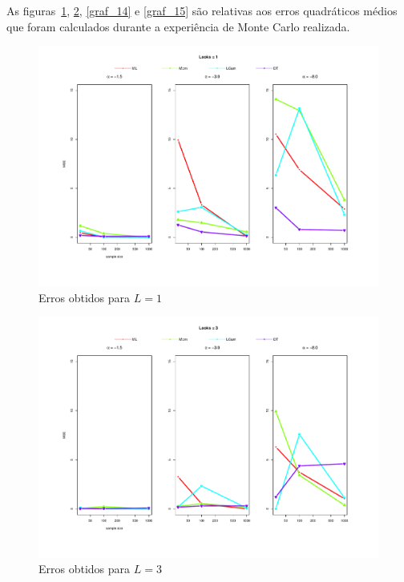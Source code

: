 As figuras~\ref{graf_12}, \ref{graf_13}, \ref{graf_14} e \ref{graf_15} são relativas aos erros quadráticos médios que foram calculados durante a experiência de Monte Carlo realizada. 
\begin{figure}[H]
     \centering
     \includegraphics[scale=0.5]{plots/mse_L=1.pdf}
     \caption{Erros obtidos para $L=1$}
     \label{graf_12}
\end{figure}
\begin{figure}[H]
     \centering
     \includegraphics[scale=0.5]{plots/mse_L=3.pdf}
     \caption{Erros obtidos para $L=3$}
     \label{graf_13}
\end{figure}
